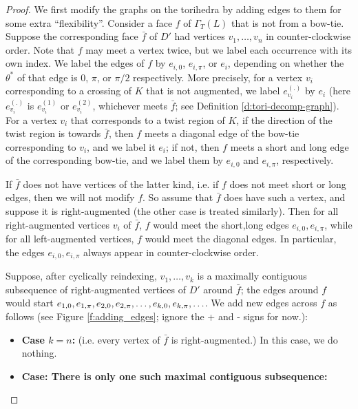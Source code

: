 \documentclass[11pt]{amsart}
\newcommand{\defref}[1]{Definition \ref{#1}}
\newcommand{\figref}[1]{Figure \ref{#1}}
\theoremstyle{plain}
\theoremstyle{definition}
\newcommand{\cm}{,\linebreak[1]}
\begin{document}
\begin{proof}
We first modify the graphs on the torihedra by adding edges
to them for some extra ``flexibility''.
Consider a face $f$ of $\Gamma_T(L)$ that is not from a bow-tie.
Suppose the corresponding face $\bar{f}$ of $D'$
had vertices $v_1,\ldots,v_n$ in counter-clockwise order.
Note that $f$ may meet a vertex twice,
but we label each occurrence with its own index.
We label the edges of $f$ by $e_{i,0}$, $e_{i,\pi}$, or $e_i$,
depending on whether the $\theta^*$ of that edge
is $0$, $\pi$, or $\pi/2$ respectively.
More precisely, for a vertex $v_i$ corresponding to a crossing
of $K$ that is not augmented,
we label $e_{v_i}^{(.)}$ by $e_i$
(here $e_{v_i}^{(.)}$ is $e_{v_i}^{(1)}$ or $e_{v_i}^{(2)}$,
whichever meets $\bar{f}$; see \defref{d:tori-decomp-graph}).
For a vertex $v_i$ that corresponds to a twist region of $K$,
if the direction of the twist region is towards $\bar{f}$,
then $f$ meets a diagonal edge of the bow-tie corresponding to $v_i$,
and we label it $e_i$;
if not, then $f$ meets a short and long edge of the corresponding bow-tie,
and we label them by $e_{i,0}$ and $e_{i,\pi}$,
respectively.


If $\bar{f}$ does not have vertices of the latter kind,
i.e. if $f$ does not meet short or long edges,
then we will not modify $f$.
So assume that $\bar{f}$ does have such a vertex,
and suppose it is right-augmented
(the other case is treated similarly).
Then for all right-augmented vertices $v_i$ of $\bar{f}$,
$f$ would meet the short,long edges $e_{i,0},e_{i,\pi}$,
while for all left-augmented vertices,
$f$ would meet the diagonal edges.
In particular,
the edges $e_{i,0}, e_{i,\pi}$ always appear in counter-clockwise order.


Suppose, after cyclically reindexing, $v_1,\ldots,v_k$
is a maximally contiguous subsequence of right-augmented vertices
of $D'$ around $\bar{f}$;
the edges around $f$ would start
$e_{1,0} \cm e_{1,\pi} \cm e_{2,0} \cm e_{2,\pi} \cm \ldots
	\cm e_{k,0} \cm e_{k,\pi} \cm \ldots$.
We add new edges across $f$ as follows
(see \figref{f:adding_edges};
ignore the + and - signs for now.):


\begin{itemize}
\item \textbf{Case $k=n$:} (i.e. every vertex of $\bar{f}$ is right-augmented.)
In this case, we do nothing.

\item \textbf{Case: There is only one such maximal contiguous subsequence:}


\end{itemize}
\end{proof}
\end{document}
